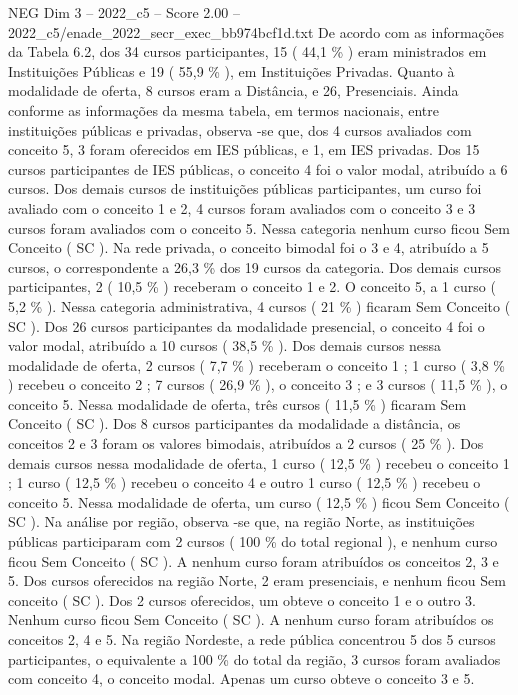 \begin{textsample}{NEG Dim 3 – 2022\_c5 – Score 2.00 – 2022\_c5/enade\_2022\_secr\_exec\_bb974bcf1d.txt}
De acordo com as informações da Tabela 6.2, dos 34 cursos participantes, 15 ( 44,1 \% ) eram ministrados em Instituições Públicas e 19 ( 55,9 \% ), em Instituições Privadas.
Quanto à modalidade de oferta, 8 cursos eram a Distância, e 26, Presenciais.
Ainda conforme as informações da mesma tabela, em termos nacionais, entre instituições públicas e privadas, observa -se que, dos 4 cursos avaliados com conceito 5, 3 foram oferecidos em IES públicas, e 1, em IES privadas.
Dos 15 cursos participantes de IES públicas, o conceito 4 foi o valor modal, atribuído a 6 cursos.
Dos demais cursos de instituições públicas participantes, um curso foi avaliado com o conceito 1 e 2, 4 cursos foram avaliados com o conceito 3 e 3 cursos foram avaliados com o conceito 5.
Nessa categoria nenhum curso ficou Sem Conceito ( SC ).
Na rede privada, o conceito bimodal foi o 3 e 4, atribuído a 5 cursos, o correspondente a 26,3 \% dos 19 cursos da categoria.
Dos demais cursos participantes, 2 ( 10,5 \% ) receberam o conceito 1 e 2.
O conceito 5, a 1 curso ( 5,2 \% ).
Nessa categoria administrativa, 4 cursos ( 21 \% ) ficaram Sem Conceito ( SC ).
Dos 26 cursos participantes da modalidade presencial, o conceito 4 foi o valor modal, atribuído a 10 cursos ( 38,5 \% ).
Dos demais cursos nessa modalidade de oferta, 2 cursos ( 7,7 \% ) receberam o conceito 1 ; 1 curso ( 3,8 \% ) recebeu o conceito 2 ; 7 cursos ( 26,9 \% ), o conceito 3 ; e 3 cursos ( 11,5 \% ), o conceito 5.
Nessa modalidade de oferta, três cursos ( 11,5 \% ) ficaram Sem Conceito ( SC ).
Dos 8 cursos participantes da modalidade a distância, os conceitos 2 e 3 foram os valores bimodais, atribuídos a 2 cursos ( 25 \% ).
Dos demais cursos nessa modalidade de oferta, 1 curso ( 12,5 \% ) recebeu o conceito 1 ; 1 curso ( 12,5 \% ) recebeu o conceito 4 e outro 1 curso ( 12,5 \% ) recebeu o conceito 5.
Nessa modalidade de oferta, um curso ( 12,5 \% ) ficou Sem Conceito ( SC ).
Na análise por região, observa -se que, na região Norte, as instituições públicas participaram com 2 cursos ( 100 \% do total regional ), e nenhum curso ficou Sem Conceito ( SC ).
A nenhum curso foram atribuídos os conceitos 2, 3 e 5.
Dos cursos oferecidos na região Norte, 2 eram presenciais, e nenhum ficou Sem conceito ( SC ).
Dos 2 cursos oferecidos, um obteve o conceito 1 e o outro 3.
Nenhum curso ficou Sem Conceito ( SC ).
A nenhum curso foram atribuídos os conceitos 2, 4 e 5.
Na região Nordeste, a rede pública concentrou 5 dos 5 cursos participantes, o equivalente a 100 \% do total da região, 3 cursos foram avaliados com conceito 4, o conceito modal.
Apenas um curso obteve o conceito 3 e 5.

\end{textsample}
